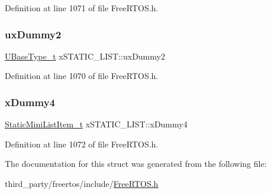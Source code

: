 Definition at line 1071 of file Free\+R\+T\+O\+S.\+h.

\mbox{\label{structxSTATIC__LIST_aa0522bc6ec8c956a9177ed9cb0e6d19f}} 
\subsubsection{\texorpdfstring{ux\+Dummy2}{uxDummy2}}
{\footnotesize\ttfamily \hyperlink{pic32mx_2portmacro_8h_a646f89d4298e4f5afd522202b11cb2e6}{U\+Base\+Type\+\_\+t} x\+S\+T\+A\+T\+I\+C\+\_\+\+L\+I\+S\+T\+::ux\+Dummy2}



Definition at line 1070 of file Free\+R\+T\+O\+S.\+h.

\mbox{\label{structxSTATIC__LIST_aafa5f9d67d7f3636f2d1f8c372e75ecf}} 
\subsubsection{\texorpdfstring{x\+Dummy4}{xDummy4}}
{\footnotesize\ttfamily \hyperlink{FreeRTOS_8h_a9097f48f4dfa56e8e01d9179462c7994}{Static\+Mini\+List\+Item\+\_\+t} x\+S\+T\+A\+T\+I\+C\+\_\+\+L\+I\+S\+T\+::x\+Dummy4}



Definition at line 1072 of file Free\+R\+T\+O\+S.\+h.



The documentation for this struct was generated from the following file\+:\begin{DoxyCompactItemize}
\item 
third\+\_\+party/freertos/include/\hyperlink{FreeRTOS_8h}{Free\+R\+T\+O\+S.\+h}\end{DoxyCompactItemize}
